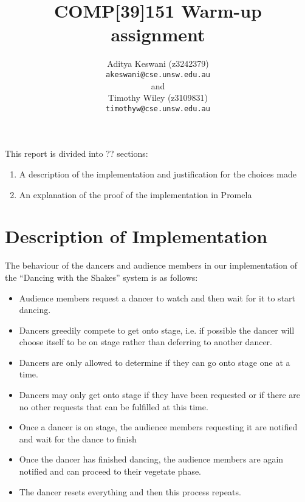 \documentclass[12pt,a4paper]{scrartcl}
\begin{document}
\title{COMP[39]151 Warm-up assignment}
\author{Aditya Keswani (z3242379) \\ 
        \texttt{akeswani@cse.unsw.edu.au} \\ 
        and \\ 
        Timothy Wiley (z3109831) \\
        \texttt{timothyw@cse.unsw.edu.au} }

\maketitle

This report is divided into ?? sections:
\begin{enumerate}
    \item A description of the implementation and justification for the choices made
    \item An explanation of the proof of the implementation in Promela
\end{enumerate}

\section{Description of Implementation}
The behaviour of the dancers and audience members in our implementation of the ``Dancing with the Shakes'' system is as follows:
\begin{itemize}
    \item Audience members request a dancer to watch and then wait for it to start dancing.
    \item Dancers greedily compete to get onto stage, i.e. if possible the dancer will choose itself to be on stage rather than deferring to another dancer.
    \item Dancers are only allowed to determine if they can go onto stage one at a time. 
    \item Dancers may only get onto stage if they have been requested or if there are no other requests that can be fulfilled at this time.
    \item Once a dancer is on stage, the audience members requesting it are notified and wait for the dance to finish
    \item Once the dancer has finished dancing, the audience members are again notified and can proceed to their vegetate phase.
    \item The dancer resets everything and then this process repeats.
\end{itemize}
\end{document}
